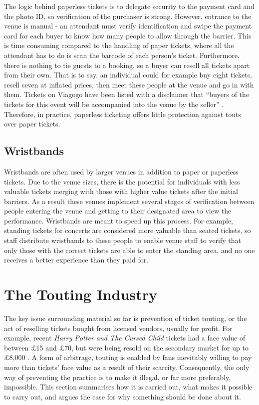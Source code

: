 \documentclass[12pt]{bhamdissertation}
\begin{document}
The logic behind paperless tickets is to delegate security to the payment card and the photo ID, so verification of the purchaser is strong. However, entrance to the venue is manual - an attendant must verify identification and swipe the payment card for each buyer to know how many people to allow through the barrier. This is time consuming compared to the handling of paper tickets, where all the attendant has to do is scan the barcode of each person's ticket. Furthermore, there is nothing to tie guests to a booking, so a buyer can resell all tickets apart from their own. That is to say, an individual could for example buy eight tickets, resell seven at inflated prices, then meet these people at the venue and go in with them. Tickets on Viagogo have been listed with a disclaimer that ``buyers of the tickets for this event will be accompanied into the venue by the seller'' \autocite{MF16}. Therefore, in practice, paperless ticketing offers little protection against touts over paper tickets.

\subsection{Wristbands}

Wristbands are often used by larger venues in addition to paper or paperless tickets. Due to the venue sizes, there is the potential for individuals with less valuable tickets merging with those with higher value tickets after the initial barriers. As a result these venues implement several stages of verification between people entering the venue and getting to their designated area to view the performance. Wristbands are meant to speed up this process. For example, standing tickets for concerts are considered more valuable than seated tickets, so staff distribute wristbands to these people to enable venue staff to verify that only those with the correct tickets are able to enter the standing area, and no one receives a better experience than they paid for.

\section{The Touting Industry}

The key issue surrounding material so far is prevention of ticket touting, or the act of reselling tickets bought from licensed vendors, usually for profit. For example, recent \textit{Harry Potter and The Cursed Child} tickets had a face value of between £15 and £70, but were being resold on the secondary market for up to £8,000 \autocite{E16}. A form of arbitrage, touting is enabled by fans inevitably willing to pay more than tickets' face value as a result of their scarcity. Consequently, the only way of preventing the practice is to make it illegal, or far more preferably, impossible. This section summarises how it is carried out, what makes it possible to carry out, and argues the case for why something should be done about it.
\end{document}
